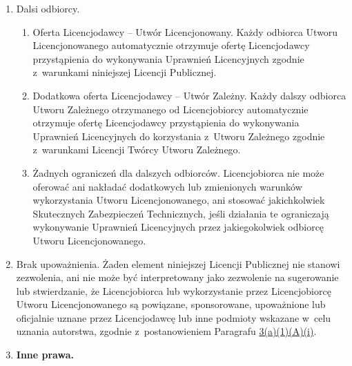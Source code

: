 \documentclass[oneside,polish,11pt,rmheadings]{mwbk}
\begin{document}
\begin{enumerate}
\item  Dalsi odbiorcy.  
\begin{enumerate}
\item  Oferta Licencjodawcy – Utwór Licencjonowany. Każdy odbiorca Utworu Licencjonowanego automatycznie otrzymuje ofertę Licencjodawcy przystąpienia do wykonywania Uprawnień Licencyjnych zgodnie z~warunkami niniejszej Licencji Publicznej.  \item  Dodatkowa oferta Licencjodawcy – Utwór Zależny. Każdy dalszy odbiorca Utworu Zależnego otrzymanego od Licencjobiorcy automatycznie otrzymuje ofertę Licencjodawcy przystąpienia do wykonywania Uprawnień Licencyjnych do korzystania z~Utworu Zależnego zgodnie z~warunkami Licencji Twórcy Utworu Zależnego.  
\item  Żadnych ograniczeń dla dalszych odbiorców. Licencjobiorca nie może oferować ani nakładać dodatkowych lub zmienionych warunków wykorzystania Utworu Licencjonowanego, ani stosować jakichkolwiek Skutecznych Zabezpieczeń Technicznych, jeśli działania te ograniczają wykonywanie Uprawnień Licencyjnych przez jakiegokolwiek odbiorcę Utworu Licencjonowanego.  
\end{enumerate}
\item  Brak upoważnienia. Żaden element niniejszej Licencji Publicznej nie stanowi zezwolenia, ani nie może być interpretowany jako zezwolenie na sugerowanie lub stwierdzanie, że Licencjobiorca lub wykorzystanie przez Licencjobiorcę Utworu Licencjonowanego są powiązane, sponsorowane, upoważnione lub oficjalnie uznane przez Licencjodawcę lub inne podmioty wskazane w~celu uznania autorstwa, zgodnie z~postanowieniem Paragrafu \href{about:reader?url=https%3A%2F%2Fcreativecommons.org%2Flicenses%2Fby-nc-sa%2F4.0%2Flegalcode.pl#s3a1Ai}{3(a)(1)(A)(i)}.  


\item \textbf{{\textmd{Inne prawa.}}} 


\end{enumerate}
\end{document}
